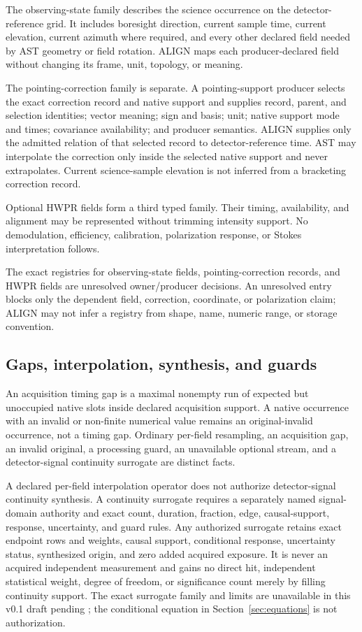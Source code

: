 The observing-state family describes the science occurrence on the
detector-reference grid.  It includes boresight direction, current sample
time, current elevation, current azimuth where required, and every other
declared field needed by AST geometry or field rotation.  ALIGN maps each
producer-declared field without changing its frame, unit, topology, or
meaning.

The pointing-correction family is separate.  A pointing-support producer
selects the exact correction record and native support and supplies record,
parent, and selection identities; vector meaning; sign and basis; unit; native
support mode and times; covariance availability; and producer semantics.
ALIGN supplies only the admitted relation of that selected record to
detector-reference time.  AST may interpolate the correction only inside the
selected native support and never extrapolates.  Current science-sample
elevation is not inferred from a bracketing correction record.

Optional HWPR fields form a third typed family.  Their timing, availability,
and alignment may be represented without trimming intensity support.  No
demodulation, efficiency, calibration, polarization response, or Stokes
interpretation follows.

The exact registries for observing-state fields, pointing-correction records,
and HWPR fields are unresolved owner/producer decisions.  An unresolved entry
blocks only the dependent field, correction, coordinate, or polarization
claim; ALIGN may not infer a registry from shape, name, numeric range, or
storage convention.

\subsection{Gaps, interpolation, synthesis, and guards}

An acquisition timing gap is a maximal nonempty run of expected but unoccupied
native slots inside declared acquisition support.  A native occurrence with
an invalid or non-finite numerical value remains an original-invalid
occurrence, not a timing gap.  Ordinary per-field resampling, an acquisition
gap, an invalid original, a processing guard, an unavailable optional stream,
and a detector-signal continuity surrogate are distinct facts.

A declared per-field interpolation operator does not authorize
detector-signal continuity synthesis.  A continuity surrogate requires a
separately named signal-domain authority and exact count, duration, fraction,
edge, causal-support, response, uncertainty, and guard rules.  Any authorized
surrogate retains exact endpoint rows and weights, causal support, conditional
response, uncertainty status, synthesized origin, and zero added acquired
exposure.  It is never an acquired independent measurement and gains no
direct hit, independent statistical weight, degree of freedom, or significance
count merely by filling continuity support.  The exact surrogate family and
limits are unavailable in this v0.1 draft pending ;
the conditional equation in Section~\ref{sec:equations} is not authorization.

